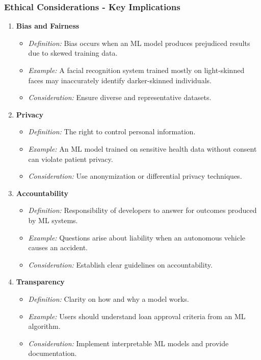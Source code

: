 \documentclass{beamer}
\begin{document}
\begin{frame}[fragile]
    \frametitle{Ethical Considerations - Key Implications}
    \begin{enumerate}
        \item \textbf{Bias and Fairness}
            \begin{itemize}
                \item \textit{Definition:} Bias occurs when an ML model produces prejudiced results due to skewed training data.
                \item \textit{Example:} A facial recognition system trained mostly on light-skinned faces may inaccurately identify darker-skinned individuals.
                \item \textit{Consideration:} Ensure diverse and representative datasets.
            \end{itemize}
        \item \textbf{Privacy}
            \begin{itemize}
                \item \textit{Definition:} The right to control personal information.
                \item \textit{Example:} An ML model trained on sensitive health data without consent can violate patient privacy.
                \item \textit{Consideration:} Use anonymization or differential privacy techniques.
            \end{itemize}
        \item \textbf{Accountability}
            \begin{itemize}
                \item \textit{Definition:} Responsibility of developers to answer for outcomes produced by ML systems.
                \item \textit{Example:} Questions arise about liability when an autonomous vehicle causes an accident.
                \item \textit{Consideration:} Establish clear guidelines on accountability.
            \end{itemize}
        \item \textbf{Transparency}
            \begin{itemize}
                \item \textit{Definition:} Clarity on how and why a model works.
                \item \textit{Example:} Users should understand loan approval criteria from an ML algorithm.
                \item \textit{Consideration:} Implement interpretable ML models and provide documentation.
            \end{itemize}
    \end{enumerate}
\end{frame}
\end{document}
